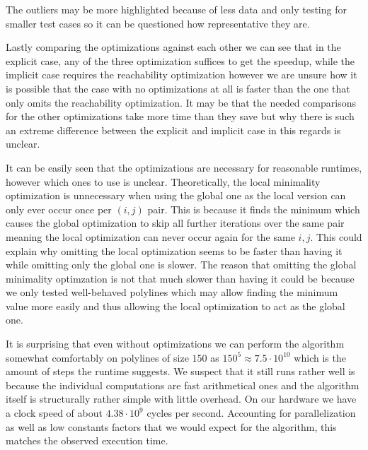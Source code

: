 The outliers may be more highlighted because of less data and only testing for smaller test cases so it can be questioned how representative they are. 

Lastly comparing the optimizations against each other we can see that in the explicit case, any of the three optimization suffices to get the speedup, while the implicit case requires the reachability optimization however we are unsure how it is possible that the case with no optimizations at all is faster than the one that only omits the reachability optimization. It may be that the needed comparisons for the other optimizations take more time than they save but why there is such an extreme difference between the explicit and implicit case in this regards is unclear. 

It can be easily seen that the optimizations are necessary for reasonable runtimes, however which ones to use is unclear. Theoretically, the local minimality optimization is unnecessary when using the global one as the local version can only ever occur once per \((i, j)\) pair. This is because it finds the minimum which causes the global optimization to skip all further iterations over the same pair meaning the local optimization can never occur again for the same \(i, j\). This could explain why omitting the local optimization seems to be faster than having it while omitting only the global one is slower. The reason that omitting the global minimality optimzation is not that much slower than having it could be because we only tested well-behaved polylines which may allow finding the minimum value more easily and thus allowing the local optimization to act as the global one. 

It is surprising that even without optimizations we can perform the algorithm somewhat comfortably on polylines of size \(150\) as \(150^5 \approx 7.5 \cdot 10^{10}\) which is the amount of steps the runtime suggests. We suspect that it still runs rather well is because the individual computations are fast arithmetical ones and the algorithm itself is structurally rather simple with little overhead. On our hardware we have a clock speed of about \(4.38 \cdot 10^9\) cycles per second. Accounting for parallelization as well as low constants factors that we would expect for the algorithm, this matches the observed execution time.

